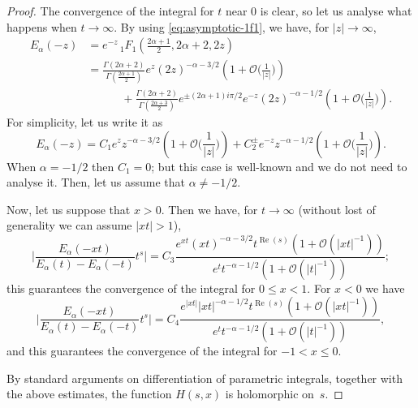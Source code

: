 \documentclass[a4paper]{amsart}
\newcommand{\Ea}{E_{\alpha}}
\newcommand{\calO}{\mathcal{O}}
\renewcommand{\Re}{\operatorname{Re}}
\theoremstyle{plain}
\theoremstyle{definition}
\theoremstyle{remark}
\numberwithin{equation}{section}
\begin{document}
\begin{proof}
The convergence of the integral for $t$ near $0$ is clear, 
so let us analyse what happens when $t \to \infty$.
By using \eqref{eq:asymptotic-1f1}, we have, for $|z|\to\infty$,
\begin{equation*}
\begin{aligned}
\Ea(-z) &= e^{-z} \,{}_1F_1\left(\frac{2\alpha+1}{2},2\alpha+2,2z\right) \\
&= \frac{\Gamma(2\alpha+2)}{\Gamma(\frac{2\alpha+1}{2})} e^z (2z)^{-\alpha-3/2} 
\left( 1 + \calO\Big(\frac{1}{|z|}\Big)\right) \\
&\qquad\quad 
+ \frac{\Gamma(2\alpha+2)}{\Gamma(\frac{2\alpha+3}{2})} e^{\pm{(2\alpha+1)i\pi}/{2}} 
e^{-z} (2z)^{-\alpha-1/2} \left( 1 + \calO\Big(\frac{1}{|z|}\Big)\right) .
\end{aligned}
\end{equation*}
For simplicity, let us write it as
\[
\Ea(-z) = C_1 e^z z^{-\alpha-3/2} \left( 1 + \calO\Big(\frac{1}{|z|}\Big)\right)
+ C_2^{\pm} e^{-z} z^{-\alpha-1/2} \left( 1 + \calO\Big(\frac{1}{|z|}\Big)\right).
\]
When $\alpha=-1/2$ then $C_1 = 0$; but this case is well-known and we do not need to analyse it. Then, let us assume that $\alpha \ne -1/2$.

Now, let us suppose that $x > 0$. Then we have, for $t \to \infty$
(without lost of generality we can assume $|xt|>1$), 
\begin{equation}
\label{asint-c3}
\Big|\frac{\Ea(-xt)}{\Ea(t)-\Ea(-t)} t^{s} \Big| = 
C_3 \frac{e^{xt} (xt)^{-\alpha-3/2} t^{\Re(s)} ( 1 + \calO(|xt|^{-1})) }
{e^t t^{-\alpha-1/2} ( 1 + \calO(|t|^{-1}))};
\end{equation}
this guarantees the convergence of the integral for $0 \le x < 1$. 
For $x < 0$ we have
\begin{equation}
\label{asint-c4}
\Big|\frac{\Ea(-xt)}{\Ea(t)-\Ea(-t)} t^{s} \Big| = 
C_4 \frac{e^{|xt|} |xt|^{-\alpha-1/2} t^{\Re(s)} ( 1 + \calO(|xt|^{-1})) }
{e^t t^{-\alpha-1/2} ( 1 + \calO(|t|^{-1}))},
\end{equation}
and this guarantees the convergence of the integral for $-1 < x \le 0$. 

By standard arguments on differentiation of parametric integrals, together with the above estimates, the function $H(s,x)$ is holomorphic on~$s$.
\end{proof}
\end{document}
